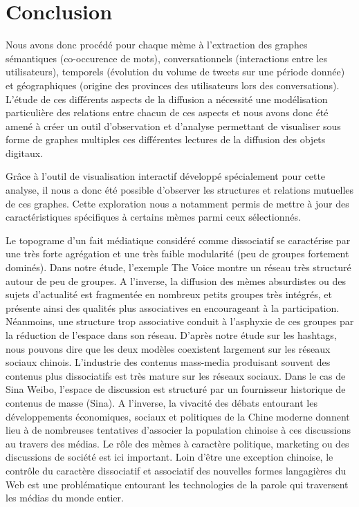 \chapter*{Conclusion}




Nous avons donc procédé pour chaque mème à l{\textquoteright}extraction des graphes sémantiques (co-occurence de mots), conversationnels (interactions entre les utilisateurs), temporels (évolution du volume de tweets sur une période donnée) et géographiques (origine des provinces des utilisateurs lors des conversations). L{\textquoteright}étude de ces différents aspects de la diffusion a nécessité une modélisation particulière des relations entre chacun de ces aspects et nous avons donc été amené à créer un outil d{\textquoteright}observation et d{\textquoteright}analyse permettant de visualiser sous forme de graphes multiples ces différentes lectures de la diffusion des objets digitaux.  


Gr\^ace à l{\textquoteright}outil de visualisation interactif développé spécialement pour cette analyse, il nous a donc été possible d{\textquoteright}observer les structures et relations mutuelles de ces graphes. Cette exploration nous a notamment permis de mettre à jour des caractéristiques spécifiques à certains mèmes parmi ceux sélectionnés.

Le topograme d’un fait médiatique considéré comme dissociatif se caractérise par une très forte agrégation et une très faible modularité (peu de groupes fortement dominés). Dans notre étude, l’exemple The Voice montre un réseau très structuré autour de peu de groupes. A l’inverse, la diffusion des mèmes absurdistes ou des sujets d’actualité est fragmentée en nombreux petits groupes très intégrés, et présente ainsi des qualités plus associatives en encourageant à la participation. Néanmoins, une structure trop associative conduit à l’asphyxie de ces groupes par la réduction de l’espace dans son réseau. D’après notre étude sur les hashtags, nous pouvons dire que les deux modèles coexistent largement sur les réseaux sociaux chinois. L’industrie des contenus mass-media produisant souvent des contenus plus dissociatifs est très mature sur les réseaux sociaux. Dans le cas de Sina Weibo, l’espace de discussion est structuré par un fournisseur historique de contenus de masse (Sina). A l’inverse, la vivacité des débats entourant les développements économiques, sociaux et politiques de la Chine moderne donnent lieu à de nombreuses tentatives d’associer la population chinoise à ces discussions au travers des médias. Le rôle des mèmes à caractère politique, marketing ou des discussions de société est ici important. Loin d’être une exception chinoise, le contrôle du caractère dissociatif et associatif des nouvelles formes langagières du Web est une problématique entourant les technologies de la parole qui traversent les médias du monde entier.

